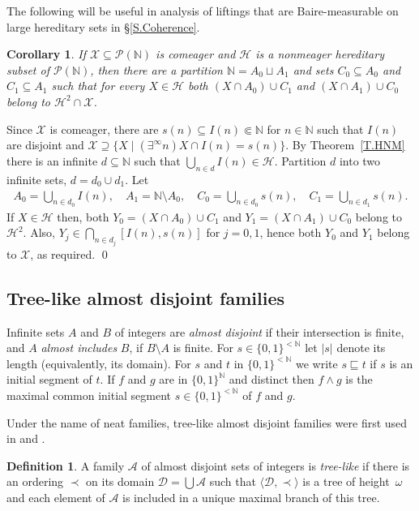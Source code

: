 \documentclass{amsart}
\makeatletter
\def\D{{\mathcal D}}
\def\N{\mathbb N}                        %
\def\A{{\mathcal A}}
\def\<{\langle}
\def\>{\rangle}
\newtheorem{coro}[proposition]{Corollary}
\theoremstyle{definition}
\newtheorem{definition}[proposition]{Definition}
\theoremstyle{remark}
\def\twolo{\{0,1\}^{<\N}}
\def\twoo{\{0,1\}^{\N}}
\renewcommand{\proofname}{Proof}
\renewenvironment{proof}[1][\proofname]{\par
\let\oldqedsymbol\qedsymbol             %
  \normalfont
  \topsep6\p@\@plus6\p@ \trivlist
  \item[\hskip\labelsep\hskip\parindent\scshape
    #1\@addpunct{.}]\ignorespaces
}{%
  \qed\endtrivlist
\global\let\qedsymbol\oldqedsymbol      %
}
\newcommand{\cP}{\mathcal P}
\newcommand{\bbN}{\mathbb N}
\newcommand{\cX}{\mathcal X}
\newcommand{\calH}{\mathcal H}
\numberwithin{claim}{subsection}
\makeatother
\begin{document}
The following will be useful in analysis of liftings that are Baire-measurable on large hereditary sets in \S\ref{S.Coherence}. 

\begin{coro}\label{C.HereditaryComeager}
	If $\cX\subseteq \cP(\bbN)$ is comeager and $\calH$ is a nonmeager hereditary subset of $\cP(\bbN)$, then there are a partition $\bbN=A_0\sqcup A_1$ and sets $C_0\subseteq A_0$ and $C_1\subseteq A_1$ such that for every $X\in \calH$ both $(X\cap A_0)\cup C_1$ and $(X\cap A_1)\cup C_0$ belong to $\calH^2\cap \cX$. 
\end{coro}

\begin{proof} Since $\cX$ is comeager, there are 
	$s(n)\subseteq I(n)\Subset \bbN$  for $n\in \bbN$ such that  $I(n)$ are disjoint and $\cX\supseteq \{X\mid (\exists ^\infty n) X\cap I(n)=s(n)\}$. By Theorem~\ref{T.HNM} there is an infinite $d\subseteq \bbN$ such that $\bigcup_{n\in d} I(n)\in \calH$. Partition $d$ into two infinite sets, $d=d_0\cup d_1$.  Let
	\begin{align*}\textstyle
		A_0=\bigcup_{n\in d_0} I(n),\quad
		A_1=\bbN\setminus A_0,\quad 
		C_0=\bigcup_{n\in d_0} s(n),\quad
		C_1=\bigcup_{n\in d_1} s(n). 
	\end{align*}
	If $X\in \calH$ then, both $Y_0=(X\cap A_0)\cup C_1$ and $Y_1=(X\cap A_1)\cup C_0$ belong to $\calH^2$. Also, $Y_j\in \bigcap_{n\in d_j} [I(n), s(n)]$ for $j=0,1$, hence both $Y_0$ and $Y_1$ belong to $\cX$, as required. 
\end{proof}



\subsection{Tree-like almost disjoint families}
Infinite sets $A$ and $B$ of integers are {\it almost
	disjoint\/} if their intersection is finite, and $A$ {\it almost
	includes\/}  $B$, 
if $B\setminus A$ is finite. 
For $s\in \twolo$ let $|s|$ denote its length (equivalently, its domain).
For $s$ and $t$ in $\twolo$ we write $s\sqsubseteq t$ if $s$ is an initial segment of $t$. If $f$ and $g$ are in $\twoo$ and distinct then $f\wedge g$ is the maximal common initial segment $s\in\twolo$ of $f$ and $g$. 


Under the name of neat families, tree-like almost disjoint families were first used in \cite[II.4.1]{Sh:Proper} and  \cite{Ve:OCA}. 

\begin{definition} \label{Def.tree-like}
	A family $\A$  of almost disjoint sets of 
	integers is  \emph{tree-like} if 
	there is an ordering $\prec$ on its domain $\D=\bigcup\A$ such that 
	$\<\D,\prec\>$ is a  tree of height~$\omega$ and each element of $\A$ is
	included in a unique  maximal branch of this tree. 
\end{definition} 
\end{document}
